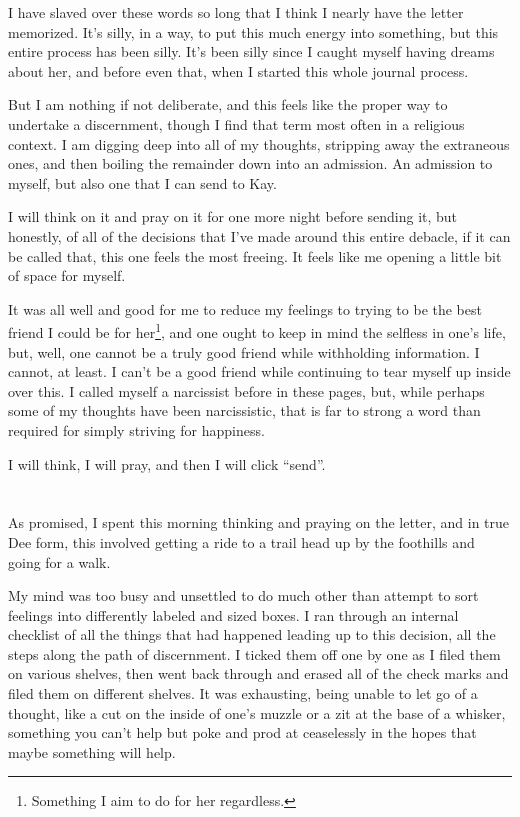I have slaved over these words so long that I think I nearly have the letter memorized. It's silly, in a way, to put this much energy into something, but this entire process has been silly. It's been silly since I caught myself having dreams about her, and before even that, when I started this whole journal process.

But I am nothing if not deliberate, and this feels like the proper way to undertake a discernment, though I find that term most often in a religious context. I am digging deep into all of my thoughts, stripping away the extraneous ones, and then boiling the remainder down into an admission. An admission to myself, but also one that I can send to Kay.

I will think on it and pray on it for one more night before sending it, but honestly, of all of the decisions that I've made around this entire debacle, if it can be called that, this one feels the most freeing. It feels like me opening a little bit of space for myself.

It was all well and good for me to reduce my feelings to trying to be the best friend I could be for her\footnote{Something I aim to do for her regardless.}, and one ought to keep in mind the selfless in one's life, but, well, one cannot be a truly good friend while withholding information. I cannot, at least. I can't be a good friend while continuing to tear myself up inside over this. I called myself a narcissist before in these pages, but, while perhaps some of my thoughts have been narcissistic, that is far to strong a word than required for simply striving for happiness.

I will think, I will pray, and then I will click ``send''.

\section{}

As promised, I spent this morning thinking and praying on the letter, and in true Dee form, this involved getting a ride to a trail head up by the foothills and going for a walk.

My mind was too busy and unsettled to do much other than attempt to sort feelings into differently labeled and sized boxes. I ran through an internal checklist of all the things that had happened leading up to this decision, all the steps along the path of discernment. I ticked them off one by one as I filed them on various shelves, then went back through and erased all of the check marks and filed them on different shelves. It was exhausting, being unable to let go of a thought, like a cut on the inside of one's muzzle or a zit at the base of a whisker, something you can't help but poke and prod at ceaselessly in the hopes that maybe something will help.

